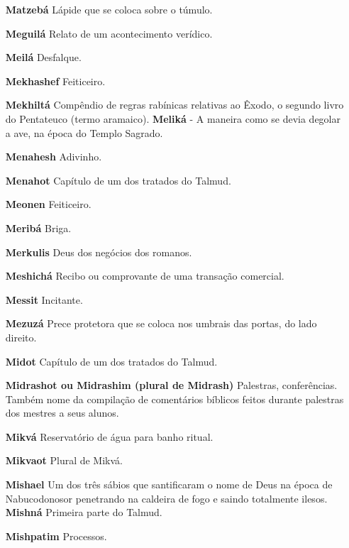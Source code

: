 \begin{itemize}
\item[\textbf{Matzebá}] Lápide que se coloca sobre o túmulo.

\item[\textbf{Meguilá}] Relato de um acontecimen­to verídico.


\item[\textbf{Meilá}] Desfalque.

\item[\textbf{Mekhashef}] Feiticeiro.

\item[\textbf{Mekhiltá}] Compêndio de regras rabí­nicas relativas ao Êxodo, o
segundo li­vro do Pentateuco (termo aramaico). \textbf{Meliká} - A
maneira como se devia dego­lar a ave, na época do Templo Sagrado.
\item[\textbf{Menahesh}] Adivinho.

\item[\textbf{Menahot}] Capítulo de um dos trata­dos do Talmud.

\item[\textbf{Meonen}] Feiticeiro.

\item[\textbf{Meribá}] Briga.

\item[\textbf{Merkulis}] Deus dos negócios dos ro­manos.

\item[\textbf{Meshichá}] Recibo ou comprovante de uma transação comercial.

\item[\textbf{Messit}] Incitante.

\item[\textbf{Mezuzá}] Prece protetora que se co­loca nos umbrais das portas,
do lado direito.

\item[\textbf{Midot}] Capítulo de um dos tratados do Talmud.

\item[\textbf{Midrashot ou Midrashim (plural de Midrash)}] Palestras,
conferências. Também nome da compilação de co­mentários bíblicos feitos
durante pales­tras dos mestres a seus alunos.

\item[\textbf{Mikvá}] Reservatório de água para ba­nho ritual.

\item[\textbf{Mikvaot}] Plural de Mikvá.

\item[\textbf{Mishael}] Um dos três sábios que san­tificaram o nome de Deus
na época de Nabucodonosor penetrando na caldei­ra de fogo e saindo
totalmente ilesos. \textbf{Mishná} Primeira parte do Talmud.
\item[\textbf{Mishpatim}] Processos.


\end{itemize}
